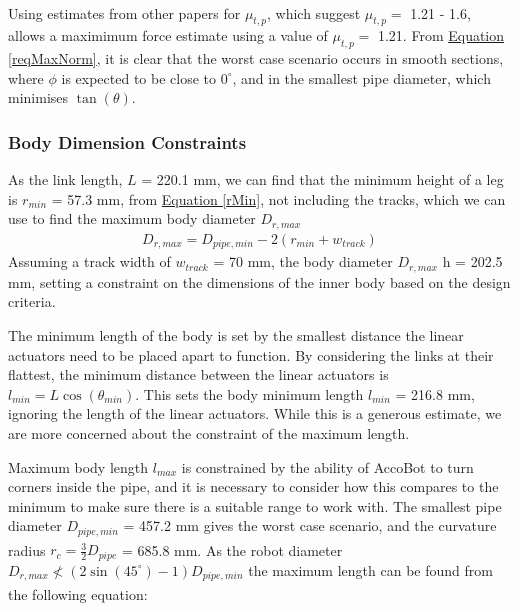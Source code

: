 \documentclass[11pt]{article}		%
\newcommand{\supercite}[1]{\textsuperscript{\cite{#1}}}		%
\newcommand{\equationref}[1]{\hyperref[#1]{Equation \ref*{#1}}}     %
\begin{document}
				Using estimates from other papers for $\mu_{t,p}$, which suggest $\mu_{t,p} = $ 1.21\supercite{sato2011development} - 1.6\supercite{park2010normal}, allows a maximimum force estimate using a value of $\mu_{t,p} = $ 1.21.
				From \equationref{reqMaxNorm}, it is clear that the worst case scenario occurs in smooth sections, where $\phi$ is expected to be close to $0^\circ$, and in the smallest pipe diameter, which minimises $\tan \left( \theta \right)$.
				
			\subsubsection{Body Dimension Constraints}
			
    		    As the link length, $L$ = 220.1 mm, we can find that the minimum height of a leg is $r_{min}$ = 57.3 mm, from \equationref{rMin}, not including the tracks, which we can use to find the maximum body diameter $D_{r,max}$
    			\begin{align}
    				D_{r,max} = D_{pipe,min} - 2 \left(r_{min} + w_{track} \right)
    			\end{align}
    			Assuming a track width of $w_{track}$ = 70 mm, the body diameter $D_{r,max}$ h = 202.5 mm, setting a constraint on the dimensions of the inner body based on the design criteria.
    			
    			The minimum length of the body is set by the smallest distance the linear actuators need to be placed apart to function.
    			By considering the links at their flattest, the minimum distance between the linear actuators is $l_{min} = L \cos \left( \theta_{min} \right)$.
    			This sets the body minimum length $l_{min}$ =  216.8 mm, ignoring the length of the linear actuators.
    			While this is a generous estimate, we are more concerned about the constraint of the maximum length.
    			
    			Maximum body length $l_{max}$ is constrained by the ability of AccoBot to turn corners inside the pipe, and it is necessary to consider how this compares to the minimum to make sure there is a suitable range to work with.
    			The smallest pipe diameter $D_{pipe,min}$ = 457.2 mm gives the worst case scenario, and the curvature radius $r_c = \frac{3}{2} D_{pipe}$\supercite{roh2005differential} = 685.8 mm.
    			As the robot diameter $D_{r,max} \nless \left( 2 \sin \left( 45^\circ \right) - 1 \right) D_{pipe,min}$ the maximum length can be found from the following equation\supercite{roh2005differential}:
    
\end{document}
